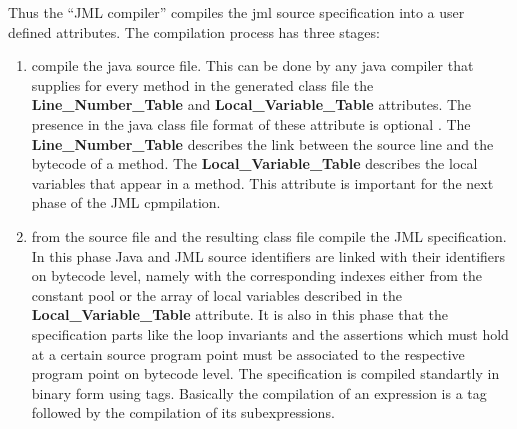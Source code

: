 Thus the ``JML compiler'' compiles the jml source specification into a user defined attributes. The compilation process has three stages:
\begin{enumerate}
\item compile the java source file. This can be done by any java compiler that supplies for every method in the generated class file the \textbf{Line\_Number\_Table} and \textbf{Local\_Variable\_Table}  attributes.
 The presence in the java class file format of these attribute is optional \cite{VMSpec}. The \textbf{Line\_Number\_Table} describes the link between the source line and the bytecode of a method.  The \textbf{Local\_Variable\_Table} describes the local variables that appear in a method. This attribute is important for the next phase of the JML cpmpilation.
\item from the source file and the resulting class file compile the JML specification. In this phase Java and JML source identifiers are linked with their identifiers on bytecode level, namely with the corresponding indexes either from the constant pool or the array of local variables described in the \textbf{Local\_Variable\_Table} attribute. It is also in this phase that the specification parts like the loop invariants and the assertions which must hold at a certain source program point must be associated to the respective program point on bytecode level. The specification
is compiled standartly in binary form using tags. Basically the compilation of an expression is a tag followed by the compilation of its subexpressions. 



\end{enumerate}
